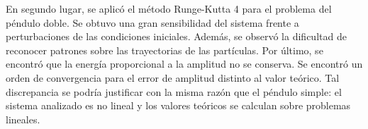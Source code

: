 \documentclass[aps,prb,twocolumn,superscriptaddress,floatfix,longbibliography,10pt]{revtex4-2}
\newcounter{para}
\begin{document}
En segundo lugar, se aplicó el método Runge-Kutta 4 para el problema del péndulo doble. Se obtuvo una gran sensibilidad del sistema frente a perturbaciones de las condiciones iniciales. Además, se observó la dificultad de reconocer patrones sobre las trayectorias de las partículas. Por último, se encontró que la energía proporcional a la amplitud no se conserva. Se encontró un orden de convergencia para el error de amplitud distinto al valor teórico. Tal discrepancia se podría justificar con la misma razón que el péndulo simple: el sistema analizado es no lineal y los valores teóricos se calculan sobre problemas lineales.



\end{document}
